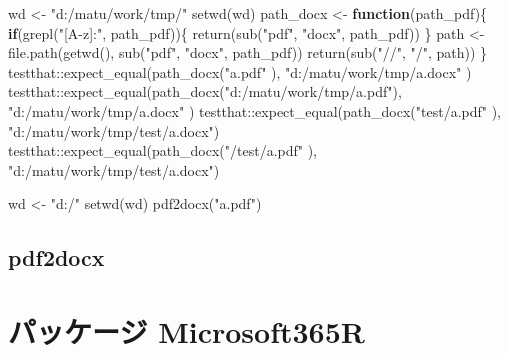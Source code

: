 \documentclass[
]{article}
\newenvironment{Shaded}{\begin{snugshade}}{\end{snugshade}}
\newcommand{\ControlFlowTok}[1]{\textcolor[rgb]{0.13,0.29,0.53}{\textbf{#1}}}
\newcommand{\FunctionTok}[1]{\textcolor[rgb]{0.00,0.00,0.00}{#1}}
\newcommand{\NormalTok}[1]{#1}
\newcommand{\OtherTok}[1]{\textcolor[rgb]{0.56,0.35,0.01}{#1}}
\newcommand{\SpecialCharTok}[1]{\textcolor[rgb]{0.00,0.00,0.00}{#1}}
\newcommand{\StringTok}[1]{\textcolor[rgb]{0.31,0.60,0.02}{#1}}
\begin{document}
\begin{Shaded}
\begin{Highlighting}[]
\NormalTok{wd }\OtherTok{\textless{}{-}} \StringTok{"d:/matu/work/tmp/"}
\FunctionTok{setwd}\NormalTok{(wd)}
\NormalTok{path\_docx }\OtherTok{\textless{}{-}} \ControlFlowTok{function}\NormalTok{(path\_pdf)\{}
  \ControlFlowTok{if}\NormalTok{(}\FunctionTok{grepl}\NormalTok{(}\StringTok{"[A{-}z]:"}\NormalTok{, path\_pdf))\{}
    \FunctionTok{return}\NormalTok{(}\FunctionTok{sub}\NormalTok{(}\StringTok{"pdf"}\NormalTok{, }\StringTok{"docx"}\NormalTok{, path\_pdf))}
\NormalTok{  \}}
\NormalTok{  path }\OtherTok{\textless{}{-}} \FunctionTok{file.path}\NormalTok{(}\FunctionTok{getwd}\NormalTok{(), }\FunctionTok{sub}\NormalTok{(}\StringTok{"pdf"}\NormalTok{, }\StringTok{"docx"}\NormalTok{, path\_pdf))}
  \FunctionTok{return}\NormalTok{(}\FunctionTok{sub}\NormalTok{(}\StringTok{"//"}\NormalTok{, }\StringTok{"/"}\NormalTok{, path))}
\NormalTok{\}}
\NormalTok{testthat}\SpecialCharTok{::}\FunctionTok{expect\_equal}\NormalTok{(}\FunctionTok{path\_docx}\NormalTok{(}\StringTok{"a.pdf"}\NormalTok{                 ), }\StringTok{"d:/matu/work/tmp/a.docx"}\NormalTok{     )}
\NormalTok{testthat}\SpecialCharTok{::}\FunctionTok{expect\_equal}\NormalTok{(}\FunctionTok{path\_docx}\NormalTok{(}\StringTok{"d:/matu/work/tmp/a.pdf"}\NormalTok{), }\StringTok{"d:/matu/work/tmp/a.docx"}\NormalTok{     )}
\NormalTok{testthat}\SpecialCharTok{::}\FunctionTok{expect\_equal}\NormalTok{(}\FunctionTok{path\_docx}\NormalTok{(}\StringTok{"test/a.pdf"}\NormalTok{            ), }\StringTok{"d:/matu/work/tmp/test/a.docx"}\NormalTok{)}
\NormalTok{testthat}\SpecialCharTok{::}\FunctionTok{expect\_equal}\NormalTok{(}\FunctionTok{path\_docx}\NormalTok{(}\StringTok{"/test/a.pdf"}\NormalTok{           ), }\StringTok{"d:/matu/work/tmp/test/a.docx"}\NormalTok{)}


\NormalTok{wd }\OtherTok{\textless{}{-}} \StringTok{"d:/"}
\FunctionTok{setwd}\NormalTok{(wd)}
\FunctionTok{pdf2docx}\NormalTok{(}\StringTok{"a.pdf"}\NormalTok{)}
\end{Highlighting}
\end{Shaded}

\hypertarget{pdf2docx-1}{%
\subsection{pdf2docx}\label{pdf2docx-1}}

\hypertarget{ux30d1ux30c3ux30b1ux30fcux30b8-microsoft365r}{%
\section{パッケージ Microsoft365R}\label{ux30d1ux30c3ux30b1ux30fcux30b8-microsoft365r}}
\end{document}
